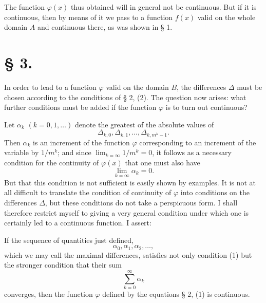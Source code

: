 The function $\varphi(x)$ thus obtained will in general not be continuous. But if it is continuous, then by means of it we pass to a function $f(x)$ valid on the whole domain $A$ and continuous there, as was shown in § 1.

\section*{§ 3.}

In order to lead to a function $\varphi$ valid on the domain $B$, the differences $\Delta$ must be chosen according to the conditions of § 2, (2). The question now arises: what further conditions must be added if the function $\varphi$ is to turn out continuous?

Let $\alpha_k$ $(k=0,1,\ldots)$ denote the greatest of the absolute values of
\[
 \Delta_{k,0},\Delta_{k,1},\ldots,\Delta_{k,m^k-1}.
\]
Then $\alpha_k$ is an increment of the function $\varphi$ corresponding to an increment of the variable by $1/m^k$; and since $\lim_{k=\infty}1/m^k=0$, it follows as a necessary condition for the continuity of $\varphi(x)$ that one must also have
\begin{equation}
 \lim_{k=\infty}\alpha_k=0.
\tag{1}
\end{equation}
But that this condition is not sufficient is easily shown by examples. It is not at all difficult to translate the condition of continuity of $\varphi$ into conditions on the differences $\Delta$, but these conditions do not take a perspicuous form. I shall therefore restrict myself to giving a very general condition under which one is certainly led to a continuous function. I assert:

If the sequence of quantities just defined,
\[
 \alpha_0,\alpha_1,\alpha_2,\ldots,
\]
which we may call the maximal differences, satisfies not only condition (1) but the stronger condition that their sum
\begin{equation}
 \sum_{k=0}^{\infty}\alpha_k
\tag{2}
\end{equation}
converges, then the function $\varphi$ defined by the equations § 2, (1) is continuous.

